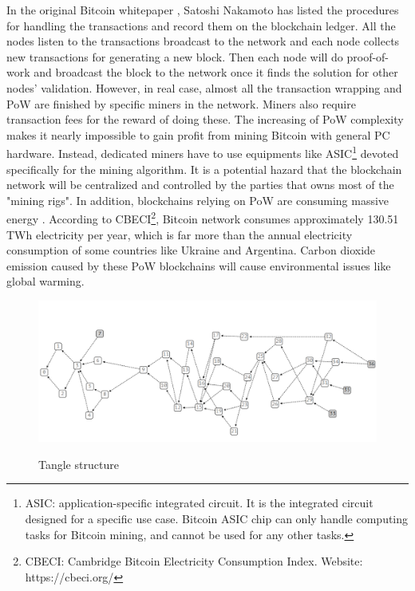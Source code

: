 In the original Bitcoin whitepaper \cite{nakamoto2008peer}, Satoshi Nakamoto has listed the procedures for handling the transactions and record them on the blockchain ledger. 
All the nodes listen to the transactions broadcast to the network and each node collects new transactions for generating a new block. 
Then each node will do proof-of-work and broadcast the block to the network once it finds the solution for other nodes' validation. 
However, in real case, almost all the transaction wrapping and PoW are finished by specific miners in the network. Miners also require transaction fees for the reward of doing these.
The increasing of PoW complexity makes it nearly impossible to gain profit from mining Bitcoin with general PC hardware. Instead, dedicated miners have to use equipments like ASIC\footnote{ASIC: application-specific integrated circuit. It is the integrated circuit designed for a specific use case. Bitcoin ASIC chip can only handle computing tasks for Bitcoin mining, and cannot be used for any other tasks.} devoted specifically for the mining algorithm.
It is a potential hazard that the blockchain network will be centralized and controlled by the parties that owns most of the "mining rigs". In addition, blockchains relying on PoW are consuming massive energy \cite{sedlmeir2020energy}. According to CBECI\footnote{CBECI: Cambridge Bitcoin Electricity Consumption Index. Website: https://cbeci.org/}, Bitcoin network consumes approximately 130.51 TWh electricity per year, which is far more than the annual electricity consumption of some countries like Ukraine and Argentina. Carbon dioxide emission caused by these PoW blockchains will cause environmental issues like global warming.

\begin{figure}[t]
    \centering
    \caption{Tangle structure}
    \includegraphics[width=\textwidth,trim={-1cm 0 0 0},clip]{figs/tangle_structure.png}
    \label{fig:tangle_structure}
\end{figure}

